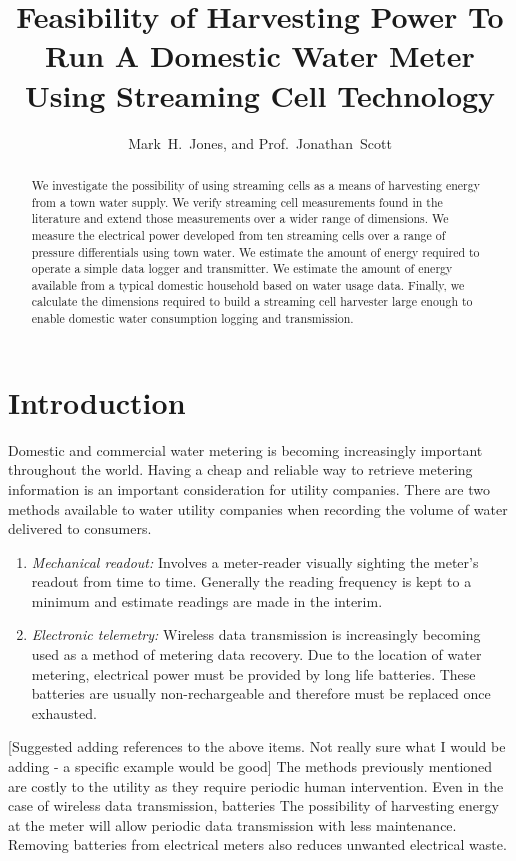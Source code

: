\documentclass[10pt,final,journal]{IEEEtran}
\title{Feasibility of Harvesting Power To Run A Domestic Water Meter Using Streaming Cell Technology}
\author{Mark~H.~Jones, and Prof.~Jonathan~Scott}
\begin{document}
    \maketitle

    \begin{abstract}
        We investigate the possibility of using streaming cells as a means of harvesting energy from a town water supply.
        We verify streaming cell measurements found in the literature and extend those measurements over a wider range of dimensions.
        We measure the electrical power developed from ten streaming cells over a range of pressure differentials using town water.
        We estimate the amount of energy required to operate a simple data logger and transmitter.
        We estimate the amount of energy available from a typical domestic household based on water usage data.
        Finally, we calculate the dimensions required to build a streaming cell harvester large enough to enable domestic water consumption logging and transmission.
    \end{abstract}

    \section{Introduction}
    Domestic and commercial water metering is becoming increasingly important throughout the world.
    Having a cheap and reliable way to retrieve metering information is an important consideration for utility companies.
    There are two methods available to water utility companies when recording the volume of water delivered to consumers.
    \begin{enumerate}
        \item \emph{Mechanical readout:}
            Involves a meter-reader visually sighting the meter's readout from time to time.
            Generally the reading frequency is kept to a minimum and estimate readings are made in the interim.
        \item \emph{Electronic telemetry:}
            Wireless data transmission is increasingly becoming used as a method of metering data recovery.
            Due to the location of water metering, electrical power must be provided by long life batteries.
            These batteries are usually non-rechargeable and therefore must be replaced once exhausted.
        \end{enumerate}
    {\color{blue}[Suggested adding references to the above items. Not really sure what I would be adding - a specific example would be good]}
    The methods previously mentioned are costly to the utility as they require periodic human intervention.
    Even in the case of wireless data transmission, batteries
    The possibility of harvesting energy at the meter will allow periodic data transmission with less maintenance.
    Removing batteries from electrical meters also reduces unwanted electrical waste.
\end{document}
